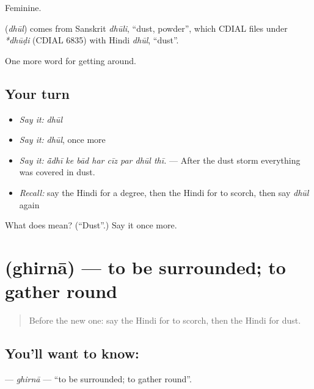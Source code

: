 Feminine.

\begin{cousinweb}
\textbf{} (\emph{dhūl}) comes from Sanskrit \emph{dhūli}, \textquotedblleft{}dust, powder\textquotedblright{}, which CDIAL files under \emph{*dhūḍi} (CDIAL 6835) with Hindi \emph{dhūl}, \textquotedblleft{}dust\textquotedblright{}.
\end{cousinweb}

\begin{grammarlens}[title={What you've built}]
One more word for getting around.
\end{grammarlens}

\subsection*{Your turn}
\begin{itemize}
\raggedright
  \item \emph{Say it:} \emph{dhūl}
  \item \emph{Say it:} \emph{dhūl}, once more
  \item \emph{Say it:} \emph{ā̃dhī ke bād har cīz par dhūl thī.} — After the dust storm everything was covered in dust.
  \item \emph{Recall:} say the Hindi for a degree, then the Hindi for to scorch, then say \emph{dhūl} again
\end{itemize}

\begin{tcolorbox}[breakable,colback=teal!4,colframe=teal!35!black,title={Before you move on}]
What does  mean? (\textquotedblleft{}Dust\textquotedblright{}.) Say it once more.
\end{tcolorbox}
\section[\texorpdfstring{\hi{घिरना} (ghirnā)}{घिरना (ghirnā)}]{ (ghirnā) — to be surrounded; to gather round}

\label{lesson:HI-C440-ghirna}



\begin{quote}
Before the new one: say the Hindi for to scorch, then the Hindi for dust.
\end{quote}

\subsection*{You'll want to know: }
\textbf{} — \emph{ghirnā} — \textquotedblleft{}to be surrounded; to gather round\textquotedblright{}.


